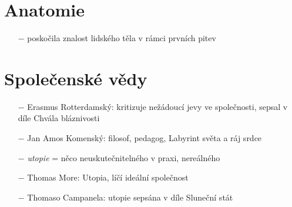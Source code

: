 \documentclass{article}
\begin{document}
\section*{Anatomie}
\begin{itemize}
    \vspace{-0.5em}
    \setlength\itemsep{0.15em}
    \item[$-$] poskočila znalost lidského těla v rámci prvních pitev
\end{itemize}

\section*{Společenské vědy}
\begin{itemize}
    \vspace{-0.5em}
    \setlength\itemsep{0.15em}
    \item[$-$] Erasmus Rotterdamský: kritizuje nežádoucí jevy ve společnosti, sepsal v díle Chvála bláznivosti
    \item[$-$] Jan Amos Komenský: filosof, pedagog, Labyrint světa a ráj srdce
    \item[$-$] \textit{utopie} = něco neuskutečnitelného v praxi, nereálného
    \item[$-$] Thomas More: Utopia, líčí ideální společnost
    \item[$-$] Thomaso Campanela: utopie sepsána v díle Sluneční stát
\end{itemize}
\end{document}
